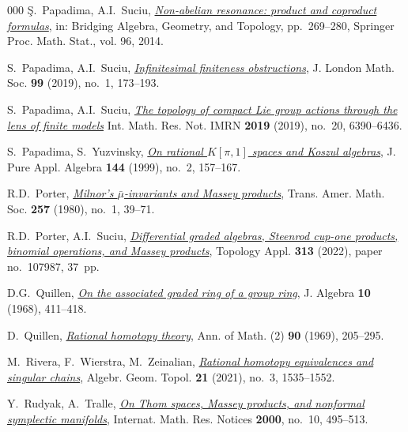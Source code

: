 \documentclass{article}
\numberwithin{equation}{section}
\theoremstyle{definition}
\begin{document}
\begin{thebibliography}{000}
 \c{S}.~Papadima, A.I.~Suciu,
\href{https://dx.doi.org/10.1007/978-3-319-09186-0\_17}%
{\em Non-abelian resonance: product and coproduct formulas}, 
in: Bridging Algebra, Geometry, and Topology, pp.~269--280, 
Springer Proc. Math. Stat., vol. 96, 2014. 

 S.~Papadima, A.I.~Suciu, 
\href{https://dx.doi.org/10.1112/jlms.12169}%
{\em Infinitesimal finiteness obstructions}, J. London Math. Soc. 
\textbf{99} (2019), no.~1, 173--193.

 S.~Papadima, A.I.~Suciu, 
\href{https://dx.doi.org//10.1093/imrn/rnx294}%
{\em The topology of compact Lie group actions through the lens of finite models} 
Int. Math. Res. Not. IMRN \textbf{2019} (2019), no.~20, 6390--6436.

 S.~Papadima, S.~Yuzvinsky,
\href{http://dx.doi.org/10.1016/S0022-4049(98)00058-9}%
{\em On rational $K[\pi,1]$ spaces and Koszul algebras}, 
J. Pure Appl. Algebra \textbf{144} (1999), no.~2, 157--167. 

 R.D.~Porter, 
\href{http://dx.doi.org/10.2307/1998124}%
{\em Milnor's $\bar{\mu}$-invariants and Massey products},
Trans. Amer. Math. Soc. \textbf{257} (1980), no.~1, 39--71.

 R.D.~Porter, A.I.~Suciu,
\href{https://doi.org/10.1016/j.topol.2021.107987}%
{\em Differential graded algebras, Steenrod cup-one 
products, binomial operations, and Massey products}, 
Topology Appl. \textbf{313} (2022), paper no.~107987, 37~pp. 

 D.G.~Quillen, 
\href{https://dx.doi.org/10.1016/0021-8693(68)90069-0}%
{\emph{On the associated graded ring of a group ring}}, 
J. Algebra \textbf{10} (1968), 411--418. 

 D.~Quillen, 
\href{https://dx.doi.org/10.2307/1970725}%
{\em Rational homotopy theory}, Ann. of Math. (2) \textbf{90}
(1969), 205--295. 

 M.~Rivera, F.~Wierstra, M.~Zeinalian,
\href{https://dx.doi.org/10.2140/agt.2021.21.1535}%
{\em Rational homotopy equivalences and singular chains}, 
Algebr. Geom. Topol. \textbf{21} (2021), no.~3, 1535--1552. 

 Y.~Rudyak, A.~Tralle, 
\href{https://dx.doi.org/10.1155/S1073792800000271}%
{\em On Thom spaces, Massey products, and nonformal symplectic 
manifolds},  Internat. Math. Res. Notices \textbf{2000}, no.~10, 495--513. 


\end{thebibliography}
\end{document}
